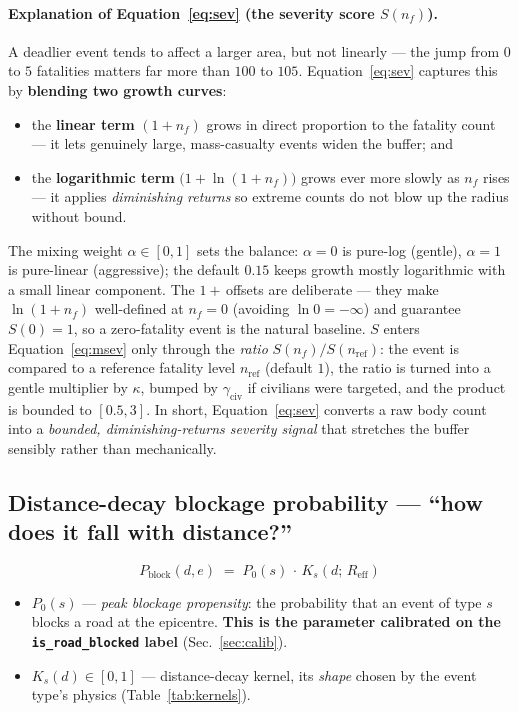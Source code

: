 \documentclass[11pt,a4paper]{article}
\newcommand{\code}[1]{\texttt{\small #1}}
\newcommand{\Reff}{R_{\mathrm{eff}}}
\newcommand{\Pblock}{P_{\mathrm{block}}}
\begin{document}
\paragraph{Explanation of Equation~\eqref{eq:sev} (the severity score $S(n_f)$).}
A deadlier event tends to affect a larger area, but not linearly --- the jump from $0$ to $5$
fatalities matters far more than $100$ to $105$. Equation~\eqref{eq:sev} captures this by
\textbf{blending two growth curves}:
\begin{itemize}[nosep,leftmargin=1.4em]
  \item the \textbf{linear term} $(1+n_f)$ grows in direct proportion to the fatality count ---
        it lets genuinely large, mass-casualty events widen the buffer; and
  \item the \textbf{logarithmic term} $\bigl(1+\ln(1+n_f)\bigr)$ grows ever more slowly as $n_f$
        rises --- it applies \emph{diminishing returns} so extreme counts do not blow up the
        radius without bound.
\end{itemize}
The mixing weight $\alpha\in[0,1]$ sets the balance: $\alpha=0$ is pure-log (gentle), $\alpha=1$
is pure-linear (aggressive); the default $0.15$ keeps growth mostly logarithmic with a small
linear component. The $1+\,$offsets are deliberate --- they make $\ln(1+n_f)$ well-defined at
$n_f=0$ (avoiding $\ln 0=-\infty$) and guarantee $S(0)=1$, so a zero-fatality event is the
natural baseline. $S$ enters Equation~\eqref{eq:msev} only through the \emph{ratio}
$S(n_f)/S(n_{\mathrm{ref}})$: the event is compared to a reference fatality level
$n_{\mathrm{ref}}$ (default $1$), the ratio is turned into a gentle multiplier by $\kappa$,
bumped by $\gamma_{\mathrm{civ}}$ if civilians were targeted, and the product is bounded to
$[0.5,3]$. In
short, Equation~\eqref{eq:sev} converts a raw body count into a \emph{bounded,
diminishing-returns severity signal} that stretches the buffer sensibly rather than mechanically.

\subsection{Distance-decay blockage probability --- ``how does it fall with distance?''}

\begin{equation}
\Pblock(d,e) \;=\; P_0(s)\,\cdot\,K_s\!\left(d;\,\Reff\right)
\label{eq:pblock}
\end{equation}

\begin{itemize}[nosep,leftmargin=1.4em]
  \item $P_0(s)$ --- \emph{peak blockage propensity}: the probability that an event of type $s$
        blocks a road at the epicentre. \textbf{This is the parameter calibrated on the
        \code{is\_road\_blocked} label} (Sec.~\ref{sec:calib}).
  \item $K_s(d)\in[0,1]$ --- distance-decay kernel, its \emph{shape} chosen by the event
        type's physics (Table~\ref{tab:kernels}).
\end{itemize}
\end{document}
